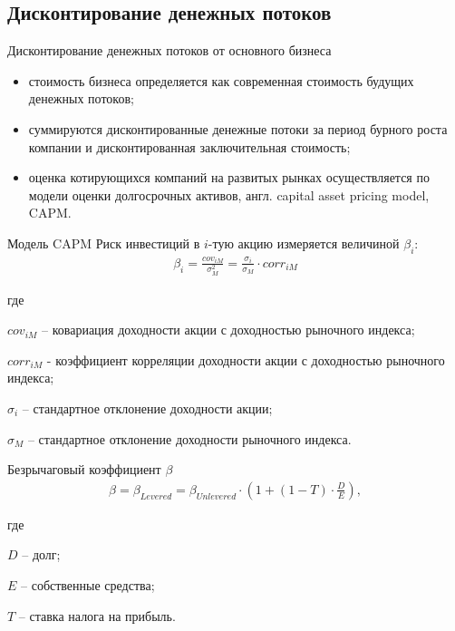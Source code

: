 \documentclass[_Venture_p2.tex]{subfiles}
\begin{document}
\subsection{Дисконтирование денежных потоков}
\begin{frame}{Дисконтирование денежных потоков от основного бизнеса}
\begin{itemize}
	\item стоимость бизнеса определяется как современная стоимость будущих денежных потоков;
	\item суммируются дисконтированные денежные потоки за период бурного роста компании и дисконтированная заключительная стоимость;
	\item оценка котирующихся компаний на развитых рынках осуществляется по модели оценки долгосрочных активов, англ. capital asset pricing model, CAPM.
\end{itemize}
\end{frame}

\begin{frame}{Модель CAPM}
Риск инвестиций в $i$-тую акцию измеряется величиной $\beta_i$:
\begin{align}
\beta_i=\frac{cov_{iM}}{\sigma_M^2} =\frac{\sigma_i}{\sigma_M}   \cdot corr_{iM}
\end{align}

где

$cov_{iM}$ – ковариация доходности акции с доходностью рыночного индекса;

$corr_{iM}$ - коэффициент корреляции доходности акции с доходностью рыночного индекса;

$\sigma_i$ – стандартное отклонение доходности акции;

$\sigma_M$ – стандартное отклонение доходности рыночного индекса.

\end{frame}

\begin{frame}{Безрычаговый коэффициент $\beta$}
\begin{align}
\beta=\beta_{Levered}=\beta_{Unlevered} \cdot \left(1+\left(1-T \right) \cdot \frac{D}{E} \right), 
\end{align}

где 

$D$ – долг;

$E$ – собственные средства;

$T$ – ставка налога на прибыль.

\end{frame}
\end{document}
